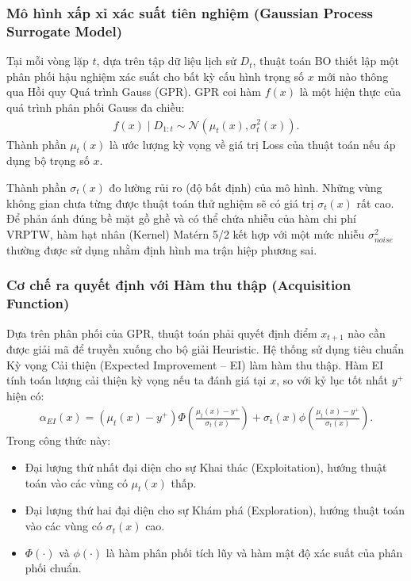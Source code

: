 \documentclass[twoside,12pt]{article}
\begin{document}
\subsubsection{Mô hình xấp xỉ xác suất tiên nghiệm (Gaussian Process Surrogate Model)}
Tại mỗi vòng lặp $t$, dựa trên tập dữ liệu lịch sử $D_t$, thuật toán BO thiết lập một phân phối hậu nghiệm xác suất cho bất kỳ cấu hình trọng số $x$ mới nào thông qua Hồi quy Quá trình Gauss (GPR). GPR coi hàm $f(x)$ là một hiện thực của quá trình phân phối Gauss đa chiều:
\begin{align}\label{eq:gpr-surrogate-model}
    f(x) \mid D_{1:t} \sim \mathcal{N}(\mu_t(x), \sigma_t^2(x)).
\end{align}
Thành phần $\mu_t(x)$ là ước lượng kỳ vọng về giá trị Loss của thuật toán nếu áp dụng bộ trọng số $x$.

Thành phần $\sigma_t(x)$ đo lường rủi ro (độ bất định) của mô hình. Những vùng không gian chưa từng được thuật toán thử nghiệm sẽ có giá trị $\sigma_t(x)$ rất cao. Để phản ánh đúng bề mặt gồ ghề và có thể chứa nhiễu của hàm chi phí VRPTW, hàm hạt nhân (Kernel) Matérn 5/2 kết hợp với một mức nhiễu $\sigma_{noise}^2$ thường được sử dụng nhằm định hình ma trận hiệp phương sai.

\subsubsection{Cơ chế ra quyết định với Hàm thu thập (Acquisition Function)}
Dựa trên phân phối của GPR, thuật toán phải quyết định điểm $x_{t+1}$ nào cần được giải mã để truyền xuống cho bộ giải Heuristic. Hệ thống sử dụng tiêu chuẩn Kỳ vọng Cải thiện (Expected Improvement -- EI) làm hàm thu thập. Hàm EI tính toán lượng cải thiện kỳ vọng nếu ta đánh giá tại $x$, so với kỷ lục tốt nhất $y^+$ hiện có:
\begin{align}\label{eq:expected-improvement-model}
    \alpha_{EI}(x) = (\mu_t(x)-y^+)\Phi\left(\frac{\mu_t(x)-y^+}{\sigma_t(x)}\right) + \sigma_t(x)\phi\left(\frac{\mu_t(x)-y^+}{\sigma_t(x)}\right).
\end{align}
Trong công thức này:
\begin{itemize}
    \item Đại lượng thứ nhất đại diện cho sự Khai thác (Exploitation), hướng thuật toán vào các vùng có $\mu_t(x)$ thấp.
    \item Đại lượng thứ hai đại diện cho sự Khám phá (Exploration), hướng thuật toán vào các vùng có $\sigma_t(x)$ cao.
    \item $\Phi(\cdot)$ và $\phi(\cdot)$ là hàm phân phối tích lũy và hàm mật độ xác suất của phân phối chuẩn.
\end{itemize}
\end{document}

